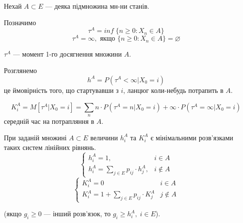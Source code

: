 
Нехай $A \subset E$ --- деяка підмножина мн-ни станів.

Позначимо
\[ \tau^{A} = inf \; \{ n \geq 0 : X_n \in A \}  \] 
\[ \tau^{A} = \infty, \text{ якщо } \{ n \geq 0 : X_n \in A \} = \varnothing \] 

$\tau^{A}$ --- момент 1-го досягнення множини $A$.

Розглянемо 
 \[ h^{A} = P\left( \tau^{A} < \infty | X_0 = i \right)  \] 
 це ймовірність того, що стартувавши з $i$, ланцюг коли-небудь потрапить в $A$.

 \[ K^{A}_{i} = M \left[ \tau^{A} | X_{0} = i \right] = \sum_{n}^{} 
 n \cdot P\left( \tau^{A} = n | X_0 = i \right) + \infty \cdot P\left( \tau^{A} = \infty | X_0 = i \right) \] 
 середній час на потрапляння в $A$.

 \begin{theorem}
   При заданій множині $A \subset E$
   величини $h^{A}_i$ та $K^{A}_{i}$ є мінімальними розв'язками таких систем
   лінійних рівнянь.
   \[ \begin{cases}
   h^{A}_i = 1, & i \in  A \\
   h^{A}_i = \sum_{j \in  E}^{} p_{ij}\cdot h^{A}_j, & i \not\in A
 \end{cases} \]
 \[ \begin{cases}
   K^{A}_i = 0 & i \in  A \\
   K^{A}_i = 1 + \sum_{j \in E}^{} p_{ij} \cdot K^{A}_j & j \not\in A
 \end{cases} \] 

 (якщо $g_i \geq 0$ --- інший розв'язок, то $g_i \geq h^{A}_i, \; i \in E$).
 \end{theorem}

